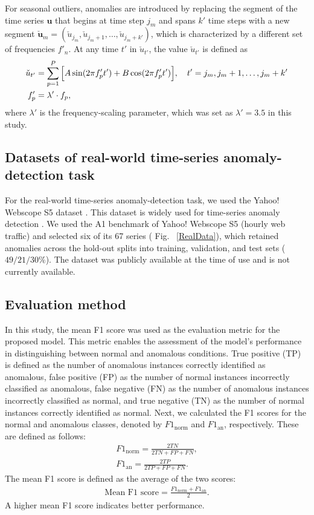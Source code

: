 \documentclass[pdflatex,sn-nature]{sn-jnl}
\theoremstyle{thmstyleone}%
\theoremstyle{thmstyletwo}%
\theoremstyle{thmstylethree}%
\begin{document}
For seasonal outliers, anomalies are introduced by replacing the segment of the time series \(\mathbf{u}\) that begins at time step \(j_m\) and spans \(k'\) time steps with a new segment \(\check{\mathbf{u}}_m = (\check{u}_{j_m},\check{u}_{j_m+1},\dots,\check{u}_{j_m+k'})\), which is characterized by a different set of frequencies \(f'_{n}\). 
At any time \(t'\) in \(\check{u}_{t'}\), the value \(\check{u}_{t'}\) is defined as
\begin{align}
    \check{u}_{t'} &= \sum_{p=1}^{P}\Big[A \sin(2\pi f'_{p}t') + B \cos(2\pi f'_{p}t')\Big],\quad t'=j_m,j_m+1,\dots,j_m+k'\\
    f'_{p} &= \lambda' \cdot f_{p}, \notag
\end{align}
where \(\lambda'\) is the frequency-scaling parameter, which was set as \(\lambda' = 3.5\) in this study.

\subsection*{Datasets of real-world time-series anomaly-detection task}
For the real-world time-series anomaly-detection task, we used the Yahoo! Webscope S5 dataset \cite{laptev2015yahoo}.
This dataset is widely used for time-series anomaly detection \cite{ren2019time,zamanzadeh2024deep,kim2023time,yoshihara2022simple,hou2025network}.
We used the A1 benchmark of Yahoo! Webscope S5 (hourly web traffic) and selected six of its 67 series ( Fig. ~\ref{RealData}), which retained anomalies across the hold-out splits into training, validation, and test sets ($49/21/30\%$).
The dataset was publicly available at the time of use and is not currently available.

\subsection*{Evaluation method}
In this study, the mean F1 score was used as the evaluation metric for the proposed model. 
This metric enables the assessment of the model’s performance in distinguishing between normal and anomalous conditions.
True positive (TP) is defined as the number of anomalous instances correctly identified as anomalous, false positive (FP) as the number of normal instances incorrectly classified as anomalous, false negative (FN) as the number of anomalous instances incorrectly classified as normal, and true negative (TN) as the number of normal instances correctly identified as normal.
Next, we calculated the F1 scores for the normal and anomalous classes, denoted by $F1_{\mathrm{norm}}$ and $F1_{\mathrm{an}}$, respectively.
These are defined as follows:
\begin{align}
F1_{\mathrm{norm}} = \frac{2TN}{2TN + FP + FN},\\
F1_{\mathrm{an}} = \frac{2TP}{2TP + FP + FN}.
\end{align}
The mean F1 score is defined as the average of the two scores:
\begin{align}
\text{Mean F1 score} = \frac{F1_{\mathrm{norm}} + F1_{\mathrm{an}}}{2}.
\end{align}
A higher mean F1 score indicates better performance.
\end{document}
